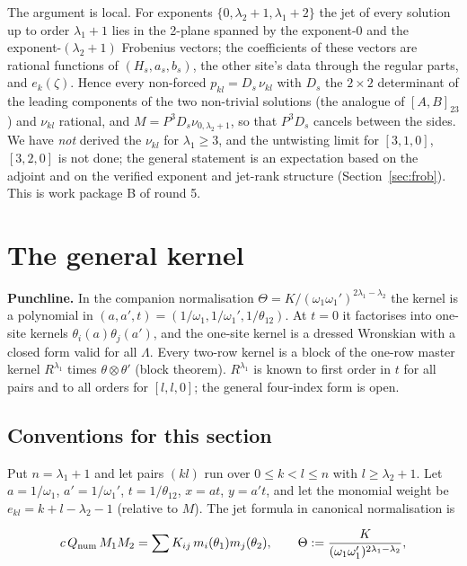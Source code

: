 \documentclass[11pt]{article}
\begin{document}
The argument is local.
For exponents $\{0,\lambda_2+1,\lambda_1+2\}$ the jet of every solution up to order $\lambda_1+1$ lies in the 2-plane spanned by the exponent-0 and the exponent-$(\lambda_2+1)$ Frobenius vectors; the coefficients of these vectors are rational functions of $(H_s,a_s,b_s)$, the other site's data through the regular parts, and $e_k(\zeta)$. Hence every non-forced $p_{kl}=D_s\,\nu_{kl}$ with $D_s$ the $2\times2$ determinant of the leading components of the two non-trivial solutions (the analogue of $[A,B]_{23}$) and $\nu_{kl}$ rational, and $M=P^3D_s\nu_{0,\lambda_2+1}$, so that $P^3D_s$ cancels between the sides.
We have \emph{not} derived the $\nu_{kl}$ for $\lambda_1\ge3$, and the untwisting limit for $[3,1,0]$, $[3,2,0]$ is not done; the general statement is an expectation based on the adjoint and on the verified exponent and jet-rank structure (Section~\ref{sec:frob}).
This is work package B of round 5.

\section{The general kernel}\label{sec:kernel}

\textbf{Punchline.} In the companion normalisation $\Theta=K/(\omega_1\omega_1')^{2\lambda_1-\lambda_2}$ the kernel is a polynomial in $(a,a',t)=(1/\omega_1,1/\omega_1',1/\theta_{12})$. At $t=0$ it factorises into one-site kernels $\theta_i(a)\theta_j(a')$, and the one-site kernel is a dressed Wronskian with a closed form valid for all $\Lambda$. Every two-row kernel is a block of the one-row master kernel $R^{\lambda_1}$ times $\theta\otimes\theta'$ (block theorem). $R^{\lambda_1}$ is known to first order in $t$ for all pairs and to all orders for $[l,l,0]$; the general four-index form is open.

\subsection{Conventions for this section}\label{sec:kconv}

Put $n=\lambda_1+1$ and let pairs $(kl)$ run over $0\le k<l\le n$ with $l\ge\lambda_2+1$. Let $a=1/\omega_1$, $a'=1/\omega_1'$, $t=1/\theta_{12}$, $x=at$, $y=a't$, and let the monomial weight be $e_{kl}=k+l-\lambda_2-1$ (relative to $M$).
The jet formula in canonical normalisation is

\begin{equation}
c\,Q_{\rm num}\,M_1M_2=\sum K_{ij}\,m_i(\theta_1)m_j(\theta_2),\qquad \Theta:=\frac K{(\omega_1\omega_1')^{2\lambda_1-\lambda_2}},\label{eq:Thetadef}
\end{equation}
\end{document}
